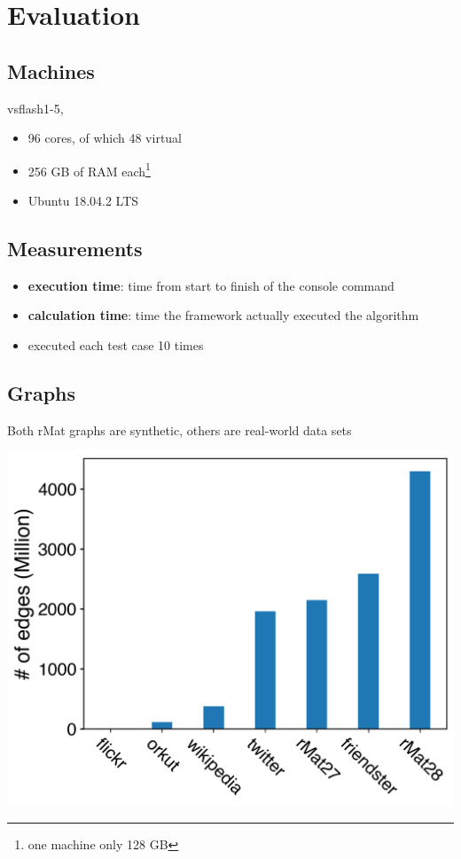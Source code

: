 \documentclass{meetings}
\begin{document}
\section{Evaluation}
\begin{multicols}{2}
\subsection*{Machines}
vsflash1-5, 
\begin{itemize}
	\item 96 cores, of which 48 virtual
	\item 256 GB of RAM each\footnote{\sffamily one machine only 128 GB}
	\item Ubuntu 18.04.2 LTS
\end{itemize}
\subsection*{Measurements}
\begin{itemize}
	\item \textbf{execution time}: time from start to finish of the console command
	\item \textbf{calculation time}: time the framework actually executed the algorithm
	\item executed each test case 10 times
\end{itemize}

\columnbreak

\subsection*{Graphs}
Both rMat graphs are synthetic, others are real-world data sets
\begin{center}
	\includegraphics[width=\linewidth]{graphsize.png}
\end{center}



\end{multicols}
\end{document}
